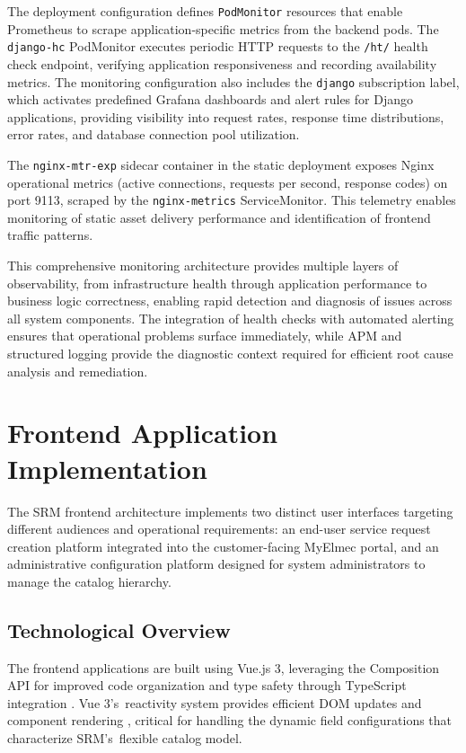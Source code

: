 The deployment configuration defines \texttt{PodMonitor} resources that enable Prometheus to scrape application-specific metrics from the backend pods. The \texttt{django-hc} PodMonitor executes periodic HTTP requests to the \texttt{/ht/} health check endpoint, verifying application responsiveness and recording availability metrics. The monitoring configuration also includes the \texttt{django} subscription label, which activates predefined Grafana dashboards and alert rules for Django applications, providing visibility into request rates, response time distributions, error rates, and database connection pool utilization.

The \texttt{nginx-mtr-exp} sidecar container in the static deployment exposes Nginx operational metrics (active connections, requests per second, response codes) on port 9113, scraped by the \texttt{nginx-metrics} ServiceMonitor. This telemetry enables monitoring of static asset delivery performance and identification of frontend traffic patterns.

This comprehensive monitoring architecture provides multiple layers of observability, from infrastructure health through application performance to business logic correctness, enabling rapid detection and diagnosis of issues across all system components. The integration of health checks with automated alerting ensures that operational problems surface immediately, while APM and structured logging provide the diagnostic context required for efficient root cause analysis and remediation.


\section{Frontend Application Implementation}

The SRM frontend architecture implements two distinct user interfaces targeting different audiences and operational requirements: an end-user service request creation platform integrated into the customer-facing MyElmec portal, and an administrative configuration platform designed for system administrators to manage the catalog hierarchy.

\subsection{Technological Overview}

The frontend applications are built using Vue.js 3, leveraging the Composition API for improved code organization and type safety through TypeScript integration \cite{vue3}. Vue 3's~reactivity system provides efficient DOM updates and component rendering \cite{vue3}, critical for handling the dynamic field configurations that characterize SRM's~flexible catalog model.

